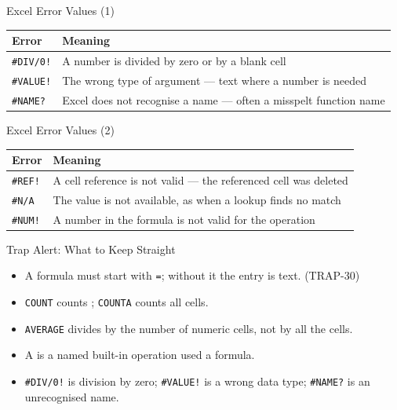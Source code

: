 \documentclass[aspectratio=169]{beamer}
\begin{document}
\begin{frame}{Excel Error Values (1)}
  \begin{center}
    \begin{tabular}{p{}p{}}
      \toprule
      \textbf{Error} & \textbf{Meaning} \\
      \midrule
      \texttt{\#DIV/0!} & A number is divided by zero or by a blank cell \\
      \texttt{\#VALUE!} & The wrong type of argument --- text where a number is needed \\
      \texttt{\#NAME?} & Excel does not recognise a name --- often a misspelt function name \\
      \bottomrule
    \end{tabular}
  \end{center}
  \vspace{0.2cm}
\end{frame}

\begin{frame}{Excel Error Values (2)}
  \begin{center}
    \begin{tabular}{p{}p{}}
      \toprule
      \textbf{Error} & \textbf{Meaning} \\
      \midrule
      \texttt{\#REF!} & A cell reference is not valid --- the referenced cell was deleted \\
      \texttt{\#N/A} & The value is not available, as when a lookup finds no match \\
      \texttt{\#NUM!} & A number in the formula is not valid for the operation \\
      \bottomrule
    \end{tabular}
  \end{center}
  \vspace{0.2cm}
\end{frame}

\begin{frame}{Trap Alert: What to Keep Straight}
  \begin{itemize}
    \item A formula must start with \texttt{=}; without it the entry is text.
      (TRAP-30)
    \item \texttt{COUNT} counts ; \texttt{COUNTA} counts all
       cells.
    \item \texttt{AVERAGE} divides by the number of numeric cells, not by all
      the cells.
    \item A  is a named built-in operation used  a
      formula.
    \item \texttt{\#DIV/0!} is division by zero; \texttt{\#VALUE!} is a wrong
      data type; \texttt{\#NAME?} is an unrecognised name.
  \end{itemize}
\end{frame}
\end{document}
